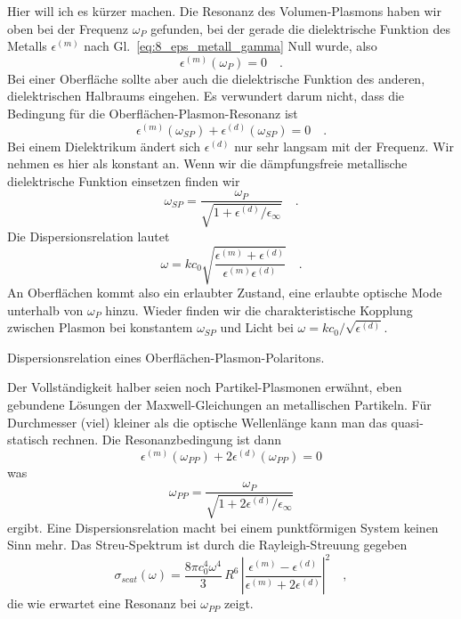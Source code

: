 Hier will ich es kürzer machen. Die Resonanz des Volumen-Plasmons haben wir oben bei der Frequenz $\omega_P$ gefunden, bei der gerade die dielektrische Funktion des Metalls $ \epsilon^{(m)}$ nach Gl.~\ref{eq:8_eps_metall_gamma} Null wurde, also 
\begin{equation}
    \epsilon^{(m)}(\omega_P) = 0 \quad .
\end{equation}
Bei einer Oberfläche sollte aber auch die dielektrische Funktion des anderen, dielektrischen Halbraums eingehen. Es verwundert darum nicht, dass die Bedingung für die Oberflächen-Plasmon-Resonanz ist
\begin{equation}
    \epsilon^{(m)}(\omega_{SP}) +  \epsilon^{(d)}(\omega_{SP}) = 0 \quad .
\end{equation}
Bei einem Dielektrikum ändert sich $\epsilon^{(d)}$ nur sehr langsam mit der Frequenz. Wir nehmen es hier als konstant an.
Wenn wir die dämpfungsfreie metallische dielektrische Funktion einsetzen finden wir
\begin{equation}
   \omega_{SP} = \frac{\omega_P}{\sqrt{1 + \epsilon^{(d)} / \epsilon_\infty }} \quad .
\end{equation}
Die Dispersionsrelation lautet
\begin{equation}
    \omega = k c_0 \sqrt{ \frac{\epsilon^{(m)}  + \epsilon^{(d)}} {\epsilon^{(m)} \epsilon^{(d)}} }  \quad .
\end{equation}
An Oberflächen kommt also ein erlaubter Zustand, eine erlaubte optische Mode unterhalb von $\omega_P$ hinzu. Wieder finden wir die charakteristische Kopplung zwischen Plasmon bei konstantem $ \omega_{SP} $ und Licht bei $\omega = k c_0 / \sqrt{\epsilon^{(d)}}$.

\begin{marginfigure}
    \caption{Dispersionsrelation eines Oberflächen-Plasmon-Polaritons.}
\end{marginfigure}

Der Vollständigkeit halber seien noch Partikel-Plasmonen erwähnt, eben gebundene Lösungen der Maxwell-Gleichungen an metallischen Partikeln. Für Durchmesser (viel) kleiner als die optische Wellenlänge kann man das quasi-statisch rechnen. Die Resonanzbedingung ist dann 
\begin{equation}
    \epsilon^{(m)}(\omega_{PP}) + 2 \epsilon^{(d)}(\omega_{PP}) = 0
\end{equation}
was
\begin{equation}
    \omega_{PP} = \frac{\omega_P}{\sqrt{1 + 2 \epsilon^{(d)}  / \epsilon_\infty} }
 \end{equation}
ergibt. Eine Dispersionsrelation macht bei einem punktförmigen System keinen Sinn mehr. Das Streu-Spektrum ist durch die Rayleigh-Streuung gegeben
\begin{equation}
    \sigma_{scat}(\omega) = \frac{8 \pi c_0^4 \omega^4}{3} \,  R^6  \,
    \left|
        \frac{\epsilon^{(m)}  - \epsilon^{(d)}} {\epsilon^{(m)} + 2\epsilon^{(d)} } \right|^2 \quad ,
\end{equation}
die wie erwartet eine Resonanz bei $\omega_{PP}$ zeigt.



